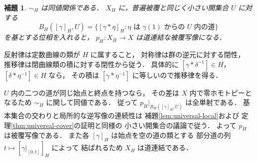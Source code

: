 \documentclass[a5paper,10pt,onecolumn]{jsarticle}
\makeatletter
\theoremstyle{mathnotetheorem}
\newtheorem{lemma}[theorem]{補題}
\renewcommand{\proofname}{証明}
\renewenvironment{proof}[1][\proofname]{%
  \par\pushQED{\qed}\normalfont\topsep4\p@\@plus2\p@\relax
  \trivlist\item[\hskip\labelsep\bfseries #1]\ignorespaces
}{\popQED\endtrivlist\@endpefalse}
\makeatother
\begin{document}
\begin{lemma}\label{lem:h-cover}
$\sim_H$ は同値関係である．
$X_H$ に，普遍被覆と同じく小さい開集合 $U$ に対する
\[
 B_H([\gamma]_H,U)
 =\{[\gamma*\eta]_H:
 \eta\text{ は }\gamma(1)\text{ からの }U\text{ 内の道}\}
\]
を基とする位相を入れると，
$p_H:X_H\to X$ は道連結な被覆写像になる．
\end{lemma}
\begin{proof}
反射律は定数曲線の類が $H$ に属すること，
対称律は群の逆元に対する閉性，
推移律は閉曲線類の積に対する閉性から従う．
具体的に
$[\gamma*\delta^{-1}]\in H$，
$[\delta*\eta^{-1}]\in H$ なら，
その積は $[\gamma*\eta^{-1}]$ に等しいので推移律を得る．

$U$ 内の二つの道が同じ始点と終点を持つなら，
その差は $X$ 内で零ホモトピーとなるため
$\sim_H$ に関して同値である．
従って $p_H|_{B_H([\gamma]_H,U)}$ は全単射である．
基本集合の交わりと局所的な逆写像の連続性は
補題\ref{lem:universal-local}および
定理\ref{thm:universal-cover}の証明と同様の
小さい開集合の議論で従う．
よって $p_H$ は被覆写像である．
また各 $[\gamma]_H$ は始点を空の道の類とする
部分道の列 $t\mapsto[\gamma|_{[0,t]}]_H$ によって
結ばれるため $X_H$ は道連結である．
\end{proof}
\end{document}

